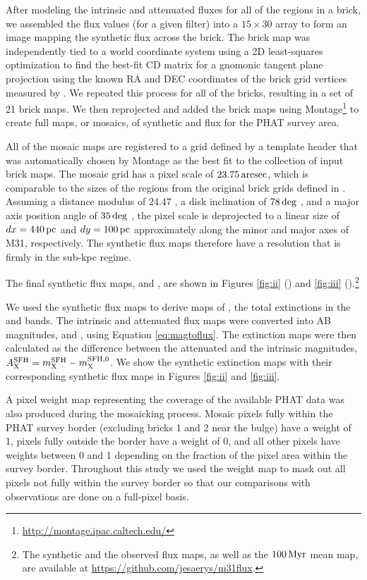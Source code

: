 \documentclass[iop, tighten]{emulateapj}
\begin{document}
After modeling the intrinsic and attenuated fluxes for all of the regions in a
brick, we assembled the flux values (for a given filter) into a $15 \times 30$
array to form an image mapping the synthetic flux across the brick. The brick
map was independently tied to a world coordinate system using a 2D least-squares
optimization to find the best-fit CD matrix \citep{Calabretta:2002} for a
gnomonic tangent plane projection using the known RA and DEC coordinates of the
brick grid vertices measured by \citet{Lewis:2015}. We repeated this process for
all of the bricks, resulting in a set of 21 brick maps. We then reprojected and
added the brick maps using
Montage\footnote{\url{http://montage.ipac.caltech.edu/}} to create full maps,
or mosaics, of synthetic \fuv{} and \nuv{} flux for the PHAT survey area.

All of the mosaic maps are registered to a grid defined by a template header
that was automatically chosen by Montage as the best fit to the collection of
input brick maps. The mosaic grid has a pixel scale of $23.75\,\mathrm{arcsec}$, which
is comparable to the sizes of the regions from the original brick grids defined
in \citet{Lewis:2015}. Assuming a distance modulus of 24.47
\citep{McConnachie:2005}, a disk inclination of $78\,\mathrm{deg}$ \citep{Tully:1994},
and a major axis position angle of $35\,\mathrm{deg}$ \citep{deVaucouleurs:1995}, the
pixel scale is deprojected to a linear size of $dx = 440\,\mathrm{pc}$ and $dy = 100\,\mathrm{pc}$
approximately along the minor and major axes of M31, respectively. The
synthetic flux maps therefore have a resolution that is firmly in the sub-kpc
regime.

The final synthetic flux maps, \fxsfhz{} and \fxsfh{}, are shown in Figures
\ref{fig:ii} (\fuv{}) and \ref{fig:iii}
(\nuv{}).\footnote{\label{github}The synthetic and the observed flux maps, as
well as the $100\,\mathrm{Myr}$ mean \sfr{} map, are available at
\url{https://github.com/jesaerys/m31flux}.}

We used the synthetic flux maps to derive maps of \ax{}, the total extinctions
in the \fuv{} and \nuv{} bands. The intrinsic and attenuated flux maps were
converted into AB magnitudes, \xsfhz{} and \xsfh{}, using Equation
\ref{eq:magtoflux}. The extinction maps were then calculated as the difference
between the attenuated and the intrinsic magnitudes, $A_{\mathrm{X}}^{\mathrm{SFH}} = m_{\mathrm{X}}^{\mathrm{SFH}} - m_{\mathrm{X}}^{\mathrm{SFH},0}$. We
show the synthetic extinction maps with their corresponding synthetic flux maps
in Figures \ref{fig:ii} and \ref{fig:iii}.

A pixel weight map representing the coverage of the available PHAT data was
also produced during the mosaicking process. Mosaic pixels fully within the
PHAT survey border (excluding bricks 1 and 2 near the bulge) have a weight of
1, pixels fully outside the border have a weight of 0, and all other pixels
have weights between 0 and 1 depending on the fraction of the pixel area within
the survey border. Throughout this study we used the weight map to mask out all
pixels not fully within the survey border so that our comparisons with
observations are done on a full-pixel basis.
\end{document}
